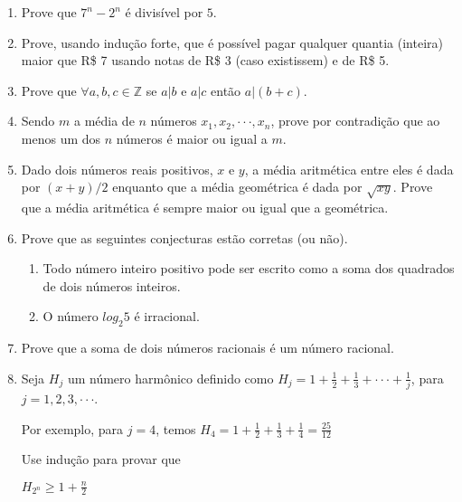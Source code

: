 \documentclass[]{book}
\theoremstyle{definition}
\newcommand{\bb}[1]{\mathbb{#1}}
\newcommand{\Z}{\bb{Z}}
\begin{document}
\begin{enumerate}
\item\label{caushw} Prove que $7^{n} - 2^{n}$ é divisível por $5$.

\item\label{caushw} Prove, usando indução forte, que é possível pagar qualquer quantia (inteira) maior que R\$ 7 usando notas de R\$ 3 (caso existissem) e de R\$ 5.

\item\label{caushw} Prove que $\forall a,b,c \in \Z$ se $a|b$ e $a|c$ então $a|(b+c)$.

\item\label{caushw} Sendo $m$ a m\'{e}dia de $n$ n\'{u}meros $x_{1}, x_{2},\cdot\cdot\cdot, x_{n}$, prove por contradi\c{c}\~{a}o que ao menos um dos $n$ n\'{u}meros \'{e} maior ou igual a $m$.

\item\label{caushw} Dado dois n\'{u}meros reais positivos, $x$ e $y$, a m\'{e}dia aritm\'{e}tica entre eles \'{e} dada por $(x+y)/2$ enquanto que a m\'{e}dia geom\'{e}trica \'{e} dada por $\sqrt{xy}$. Prove que a m\'{e}dia aritm\'{e}tica \'{e} sempre maior ou igual que a geom\'{e}trica.

\item\label{caushw} Prove que  as seguintes conjecturas est\~{a}o corretas (ou n\~{a}o).

\begin{enumerate}
\item Todo n\'{u}mero inteiro positivo pode ser escrito como a soma dos quadrados de dois n\'{u}meros inteiros.
\item O n\'{u}mero $log_{2}5$ \'{e} irracional.
\end{enumerate}

\item\label{caushw} Prove que a soma de dois n\'{u}meros racionais \'{e} um n\'{u}mero racional.

\item\label{caushw} Seja $H_{j}$ um n\'{u}mero harm\^{o}nico definido como $H_{j} = 1 + \frac{1}{2} + \frac{1}{3} + \cdot\cdot\cdot + \frac{1}{j}$, para $j=1,2,3,\cdot\cdot\cdot$. 

\vspace{0.5cm}
Por exemplo, para $j=4$, temos $H_{4} = 1 + \frac{1}{2} + \frac{1}{3} + \frac{1}{4} = \frac{25}{12}$

\vspace{0.5cm}
Use indu\c{c}\~{a}o para provar que
\vspace{0.5cm}

$H_{2^{n}} \geq 1+\frac{n}{2}$


\end{enumerate}
\end{document}
